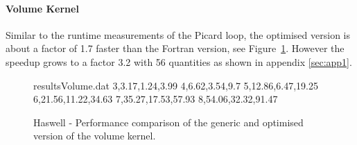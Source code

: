 \documentclass{acm_proc_article-sp}
\begin{document}
 


\paragraph{Volume Kernel}
Similar to the runtime measurements of the Picard loop, the optimised version is about a factor of 1.7 faster than the Fortran version, see Figure~\ref{fig:resultsVolume}. However the speedup grows to a factor 3.2 with 56 quantities as shown in appendix \ref{sec:app1}.

\begin{figure}
\begin{filecontents}{resultsVolume.dat}
3,3.17,1.24,3.99
4,6.62,3.54,9.7
5,12.86,6.47,19.25
6,21.56,11.22,34.63
7,35.27,17.53,57.93
8,54.06,32.32,91.47
\end{filecontents}
\caption{Haswell - Performance comparison of the generic and optimised version of the volume kernel.}\label{fig:resultsVolume}
\end{figure}
\end{document}
